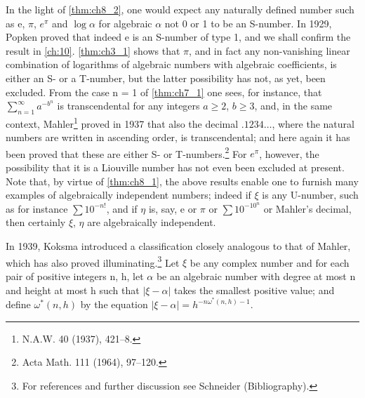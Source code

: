 In the light of \autoref{thm:ch8_2}, one would expect any naturally defined number such as e,  $\pi$,  $e^{\pi}$  and  $\log \alpha$  for algebraic  $\alpha$  not 0 or 1 to be an S-number. In 1929, Popken proved that indeed e is an S-number of type 1, and we shall confirm the result in \autoref{ch:10}. \autoref{thm:ch3_1} shows that  $\pi$, and in fact any non-vanishing linear combination of logarithms of algebraic numbers with algebraic coefficients, is either an S- or a T-number, but the latter possibility has not, as yet, been excluded. From the case n = 1 of \autoref{thm:ch7_1} one sees, for instance, that  $\sum_{n=1}^{\infty} a^{-b^n}$  is transcendental for any integers  $a \ge 2$,  $b \ge 3$, and, in the same context, Mahler\footnote{N.A.W. 40 (1937), 421--8.} proved in 1937 that also the decimal  $.1234 \dots$, where the natural numbers are written in ascending order, is transcendental; and here again it has been proved that these are either S- or T-numbers.\footnote{Acta Math. 111 (1964), 97--120.} For  $e^{\pi}$, however, the possibility that it is a Liouville number has not even been excluded at present. Note that, by virtue of \autoref{thm:ch8_1}, the above results enable one to furnish many examples of algebraically independent numbers; indeed if  $\xi$  is any U-number, such as for instance  $\sum 10^{-n!}$, and if  $\eta$  is, say, e or  $\pi$  or  $\sum 10^{-10^n}$  or Mahler's decimal, then certainly  $\xi$,  $\eta$  are algebraically independent.

In 1939, Koksma introduced a classification closely analogous to that of Mahler, which has also proved illuminating.\footnote{For references and further discussion see Schneider (Bibliography).} Let  $\xi$  be any complex number and for each pair of positive integers n, h, let  $\alpha$  be an algebraic number with degree at most n and height at most h such that  $|\xi - \alpha|$  takes the smallest positive value; and define  $\omega^*(n, h)$  by the equation  $|\xi - \alpha| = h^{-n\omega^*(n, h)-1}$.

